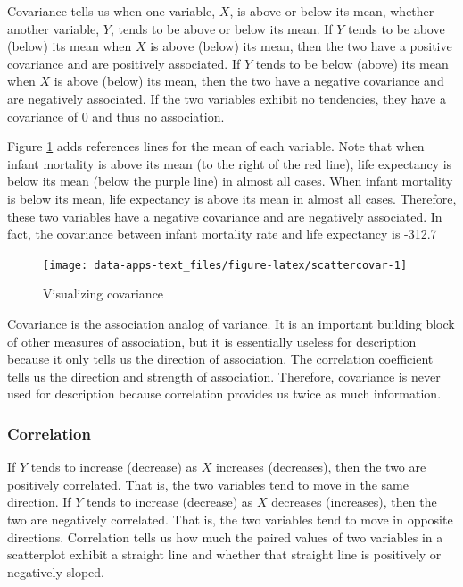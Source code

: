 \documentclass[
]{book}
\begin{document}
Covariance tells us when one variable, \(X\), is above or below its mean, whether another variable, \(Y\), tends to be above or below its mean. If \(Y\) tends to be above (below) its mean when \(X\) is above (below) its mean, then the two have a positive covariance and are positively associated. If \(Y\) tends to be below (above) its mean when \(X\) is above (below) its mean, then the two have a negative covariance and are negatively associated. If the two variables exhibit no tendencies, they have a covariance of 0 and thus no association.

Figure \ref{fig:scattercovar} adds references lines for the mean of each variable. Note that when infant mortality is above its mean (to the right of the red line), life expectancy is below its mean (below the purple line) in almost all cases. When infant mortality is below its mean, life expectancy is above its mean in almost all cases. Therefore, these two variables have a negative covariance and are negatively associated. In fact, the covariance between infant mortality rate and life expectancy is -312.7

\begin{figure}

{\centering \texttt{[image: data-apps-text\_files/figure-latex/scattercovar-1]} 

}

\caption{Visualizing covariance}\label{fig:scattercovar}
\end{figure}

Covariance is the association analog of variance. It is an important building block of other measures of association, but it is essentially useless for description because it only tells us the direction of association. The correlation coefficient tells us the direction and strength of association. Therefore, covariance is never used for description because correlation provides us twice as much information.

\hypertarget{correlation}{%
\subsubsection*{Correlation}\label{correlation}}


If \(Y\) tends to increase (decrease) as \(X\) increases (decreases), then the two are positively correlated. That is, the two variables tend to move in the same direction. If \(Y\) tends to increase (decrease) as \(X\) decreases (increases), then the two are negatively correlated. That is, the two variables tend to move in opposite directions. Correlation tells us how much the paired values of two variables in a scatterplot exhibit a straight line and whether that straight line is positively or negatively sloped.
\end{document}
